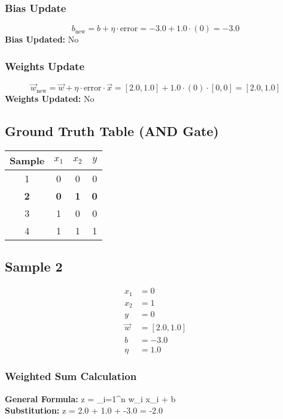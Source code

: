 \documentclass{article}
\begin{document}
\subsubsection*{Bias Update}
\[
b_{\text{new}} = b + \eta \cdot \text{error} = -3.0 + 1.0 \cdot (0) = -3.0
\]
\textbf{Bias Updated:} No

\subsubsection*{Weights Update}
\[
\vec{w}_{\text{new}} = \vec{w} + \eta \cdot \text{error} \cdot \vec{x} = 
[2.0, 1.0] + 1.0 \cdot (0) \cdot [0, 0] = 
[2.0, 1.0]
\]
\textbf{Weights Updated:} No

\subsection*{Ground Truth Table (AND Gate)}
\begin{center}
\begin{tabular}{|c|c|c|c|}
\hline
\textbf{Sample} & $x_1$ & $x_2$ & $y$ \\
\hline
1 & 0 & 0 & 0 \\
\hline
\rowcolor{yellow} \textbf{2} & \textbf{0} & \textbf{1} & \textbf{0} \\
\hline
3 & 1 & 0 & 0 \\
\hline
4 & 1 & 1 & 1 \\
\hline
\end{tabular}
\end{center}

\subsection*{Sample 2}
\begin{align*}
x_1 &= 0 \\
x_2 &= 1 \\
y &= 0 \\
\vec{w} &= [2.0, 1.0] \\
b &= -3.0 \\
\eta &= 1.0
\end{align*}

\subsubsection*{Weighted Sum Calculation}
\textbf{General Formula:} \quad
z = \sum_{i=1}^{n} w_i x_i + b
\\
\textbf{Substitution:} \quad
z = 2.0  + 1.0  + -3.0 = -2.0
\end{document}
